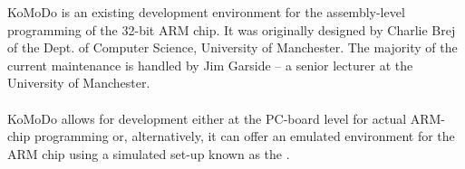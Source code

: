 KoMoDo is an existing development environment for the assembly-level programming of the 32-bit ARM chip.  It was originally designed by Charlie Brej of the Dept. of Computer Science, University of Manchester. The majority of the current maintenance is handled by Jim Garside – a senior lecturer at the University of Manchester.\\\\
%
KoMoDo allows for development either at the PC-board level for actual ARM-chip programming or, alternatively, it can offer an emulated environment for the ARM chip using a simulated set-up known as the .
